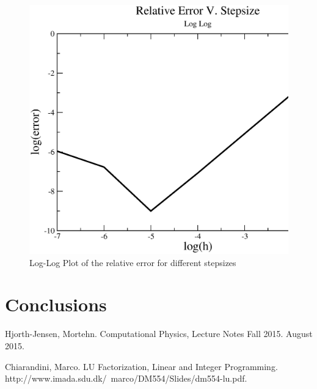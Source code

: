 \documentclass[%
oneside,                 %
final,                   %
10pt]{article}
\begin{document}
\begin{figure}[H]\label{fig:error}
  \centering
    \includegraphics[width=1.2\textwidth]{RelativeError.eps}
    \caption{Log-Log Plot of the relative error for different stepsizes}
\end{figure}

\section{Conclusions}

\begin{thebibliography}{9}

Hjorth-Jensen, Mortehn. 
Computational Physics, Lecture Notes Fall 2015. 
August 2015.

Chiarandini, Marco. 
LU Factorization, Linear and Integer Programming. 
http://www.imada.sdu.dk/~marco/DM554/Slides/dm554-lu.pdf.

\end{thebibliography}




\end{document}
